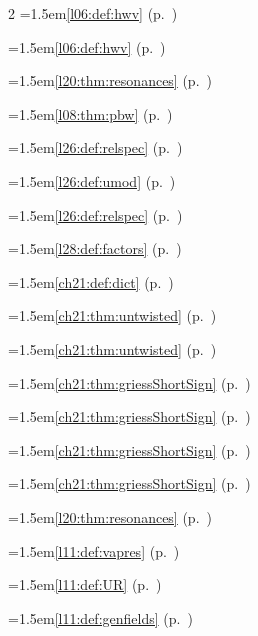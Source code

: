 \begin{multicols}{2}
\hangindent=1.5em\quad \ref{l06:def:hwv} (p.~\pageref{l06:def:hwv})\par
\hangindent=1.5em\quad \ref{l06:def:hwv} (p.~\pageref{l06:def:hwv})\par
\hangindent=1.5em\quad \ref{l20:thm:resonances} (p.~\pageref{l20:thm:resonances})\par
\hangindent=1.5em\quad \ref{l08:thm:pbw} (p.~\pageref{l08:thm:pbw})\par
\hangindent=1.5em\quad \ref{l26:def:relspec} (p.~\pageref{l26:def:relspec})\par
\hangindent=1.5em\quad \ref{l26:def:umod} (p.~\pageref{l26:def:umod})\par
\hangindent=1.5em\quad \ref{l26:def:relspec} (p.~\pageref{l26:def:relspec})\par
\hangindent=1.5em\quad \ref{l28:def:factors} (p.~\pageref{l28:def:factors})\par
\hangindent=1.5em\quad \ref{ch21:def:dict} (p.~\pageref{ch21:def:dict})\par
\hangindent=1.5em\quad \ref{ch21:thm:untwisted} (p.~\pageref{ch21:thm:untwisted})\par
\hangindent=1.5em\quad \ref{ch21:thm:untwisted} (p.~\pageref{ch21:thm:untwisted})\par
\hangindent=1.5em\quad \ref{ch21:thm:griessShortSign} (p.~\pageref{ch21:thm:griessShortSign})\par
\hangindent=1.5em\quad \ref{ch21:thm:griessShortSign} (p.~\pageref{ch21:thm:griessShortSign})\par
\hangindent=1.5em\quad \ref{ch21:thm:griessShortSign} (p.~\pageref{ch21:thm:griessShortSign})\par
\hangindent=1.5em\quad \ref{ch21:thm:griessShortSign} (p.~\pageref{ch21:thm:griessShortSign})\par
\hangindent=1.5em\quad \ref{l20:thm:resonances} (p.~\pageref{l20:thm:resonances})\par
\hangindent=1.5em\quad \ref{l11:def:vapres} (p.~\pageref{l11:def:vapres})\par
\hangindent=1.5em\quad \ref{l11:def:UR} (p.~\pageref{l11:def:UR})\par
\hangindent=1.5em\quad \ref{l11:def:genfields} (p.~\pageref{l11:def:genfields})\par

\end{multicols}
